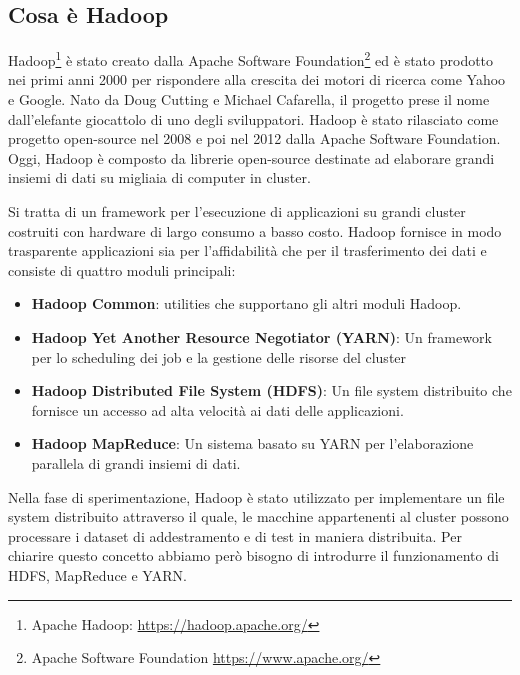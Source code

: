 \subsection{Cosa è Hadoop}
Hadoop\footnote{Apache Hadoop: \href{https://hadoop.apache.org/}{https://hadoop.apache.org/}} è stato creato dalla Apache Software Foundation\footnote{Apache Software Foundation \href{https://www.apache.org/}{https://www.apache.org/}} ed è stato prodotto nei primi anni 2000 per rispondere alla crescita dei motori di ricerca come Yahoo e Google. Nato da Doug Cutting e Michael Cafarella, il progetto prese il nome dall'elefante giocattolo di uno degli sviluppatori. Hadoop è stato rilasciato come progetto open-source nel 2008 e poi nel 2012 dalla Apache Software Foundation. Oggi, Hadoop è composto da librerie open-source destinate ad elaborare grandi insiemi di dati su migliaia di computer in cluster.

Si tratta di un framework per l'esecuzione di applicazioni su grandi cluster costruiti con hardware di largo consumo a basso costo. Hadoop fornisce in modo trasparente applicazioni sia per l'affidabilità che per il trasferimento dei dati e consiste di quattro moduli principali:
\begin{itemize}
    \item \textbf{Hadoop Common}: utilities che supportano gli altri moduli Hadoop.
    \item \textbf{Hadoop Yet Another Resource Negotiator (YARN)}: Un framework per lo scheduling dei job e la gestione delle risorse del cluster
    \item \textbf{Hadoop Distributed File System (HDFS)}: Un file system distribuito che fornisce un accesso ad alta velocità ai dati delle applicazioni.
    \item \textbf{Hadoop MapReduce}: Un sistema basato su YARN per l'elaborazione parallela di grandi insiemi di dati.
\end{itemize}

Nella fase di sperimentazione, Hadoop è stato utilizzato per implementare un file system distribuito attraverso il quale, le macchine appartenenti al cluster possono processare i dataset di addestramento e di test in maniera distribuita. Per chiarire questo concetto abbiamo però bisogno di introdurre il funzionamento di HDFS, MapReduce e YARN.